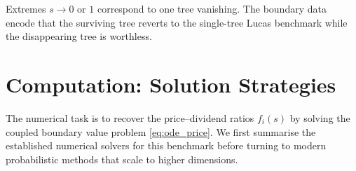 ﻿\documentclass[11pt,letterpaper,oneside]{article}
\numberwithin{equation}{section}
\newcommand{\1}{\mathbf{1}}
\begin{document}
\begin{tcolorbox}[didacticstyle]
Extremes $s\to0$ or $1$ correspond to one tree vanishing. The boundary data encode that the surviving tree reverts to the single-tree Lucas benchmark while the disappearing tree is worthless.
\end{tcolorbox}

\section{Computation: Solution Strategies}\label{sec:computation}
The numerical task is to recover the price--dividend ratios $f_i(s)$ by solving the coupled boundary value problem \eqref{eq:ode_price}. We first summarise the established numerical solvers for this benchmark before turning to modern probabilistic methods that scale to higher dimensions.
\end{document}
